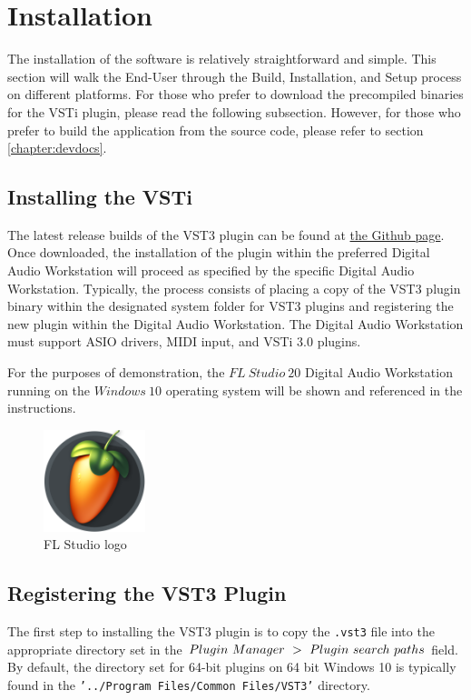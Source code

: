\documentclass[a4paper,12pt]{report}
\begin{document}
\section{Installation}
\label{sec:installation}
The installation of the software is relatively straightforward and simple. This section will walk the End-User through the Build, Installation, and Setup process on different platforms. For those who prefer to download the precompiled binaries for the VSTi plugin, please read the following subsection. However, for those who prefer to build the application from the source code, please refer to section \ref{chapter:devdocs}.

\subsection{Installing the VSTi}
\label{subsec:installvsti}
The latest release builds of the VST3 plugin can be found at \href{https://github.com/ParadoxChains/C3JI5D-Evan-Sitt-BSc-Thesis/tree/master/Release\%20Builds}{the Github page}. Once downloaded, the installation of the plugin within the preferred Digital Audio Workstation will proceed as specified by the specific Digital Audio Workstation. Typically, the process consists of placing a copy of the VST3 plugin binary within the designated system folder for VST3 plugins and registering the new plugin within the Digital Audio Workstation. The Digital Audio Workstation must support ASIO drivers, MIDI input, and VSTi 3.0 plugins.

For the purposes of demonstration, the $FL\ Studio\ 20$ Digital Audio Workstation running on the $Windows\ 10$ operating system will be shown and referenced in the instructions.

\begin{figure} \centering
\includegraphics[width=8em]{FLStudioLogo.png}
    \caption{FL Studio logo}     \label{fig:FLLogo} \end{figure}

\subsection{Registering the VST3 Plugin}
\label{subsec:registeringvsti}
The first step to installing the VST3 plugin is to copy the \texttt{.vst3} file into the appropriate directory set in the $Plugin\ \-Manager\ \->\ \-Plugin\ \-search\ \-paths$ field. By default, the directory set for 64-bit plugins on 64 bit Windows 10 is typically found in the \texttt{'../Program Files/Common Files/VST3'} directory. 
\end{document}
